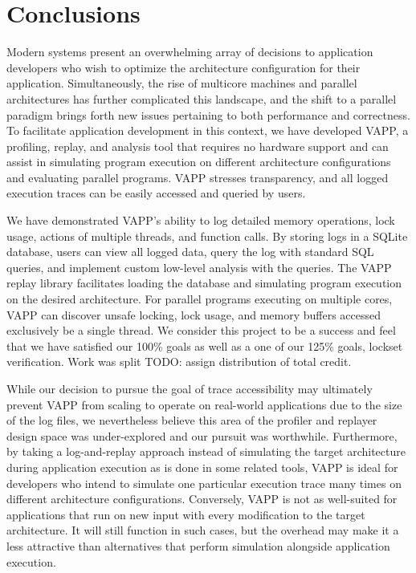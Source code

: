 \section{Conclusions}
Modern systems present an overwhelming array of decisions to
application developers who wish to optimize the architecture 
configuration for their application.  Simultaneously, the
rise of multicore machines and parallel architectures has
further complicated this landscape, and the shift to a parallel
paradigm brings forth new issues pertaining to both performance
and correctness.  To facilitate application development in this
context, we have developed VAPP, a profiling, replay, and analysis tool that 
requires no hardware support and can assist in simulating
program execution on different architecture configurations and
evaluating parallel programs.  VAPP stresses transparency, and
all logged execution traces can be easily accessed and queried
by users.

We have demonstrated VAPP's ability to log detailed memory operations,
lock usage, actions of multiple threads, and function calls.  By
storing logs in a SQLite database, users can view all logged data,
query the log with standard SQL queries, and implement custom
low-level analysis with the queries.  The VAPP replay library
facilitates loading the database and simulating program execution
on the desired architecture.  For parallel programs executing on multiple
cores, VAPP can discover unsafe locking, lock usage, and memory
buffers accessed exclusively be a single thread.  We consider this
project to be a success and feel that we have satisfied our 100\%
goals as well as a one of our 125\% goals, lockset verification.
Work was split TODO: assign distribution of total credit.

While our decision to pursue the goal of trace accessibility may
ultimately prevent VAPP from scaling to operate on real-world
applications due to the size of the log files, we nevertheless
believe this area of the profiler and replayer
design space was under-explored and our pursuit was worthwhile.
Furthermore, by taking a log-and-replay approach instead of
simulating the target architecture during application execution
as is done in some related tools, VAPP is ideal for developers
who intend to simulate one particular execution trace many
times on different architecture configurations.  Conversely,
VAPP is not as well-suited for applications that run on new
input with every modification to the target architecture.  It will
still function in such cases, but the overhead may make it a less
attractive than alternatives that perform simulation alongside
application execution.

